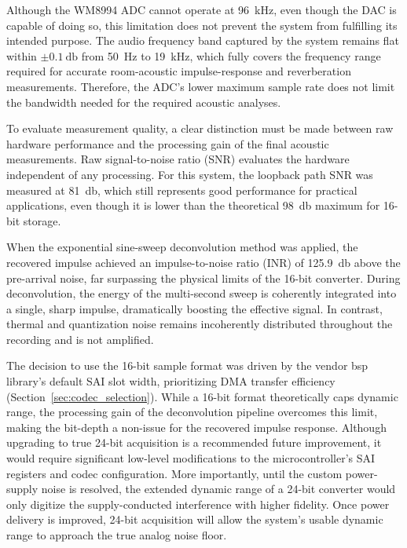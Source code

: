 Although the WM8994 ADC cannot operate at \SI{96}{\kilo\hertz}, even though the DAC is capable of doing so, this limitation does not prevent the system from fulfilling its intended purpose. The audio frequency band captured by the system remains flat within $\pm\SI{0.1}{\decibel}$ from \SI{50}{\hertz} to \SI{19}{\kilo\hertz}, which fully covers the frequency range required for accurate room-acoustic impulse-response and reverberation measurements. Therefore, the ADC’s lower maximum sample rate does not limit the bandwidth needed for the required acoustic analyses.

To evaluate measurement quality, a clear distinction must be made between raw hardware performance and the processing gain of the final acoustic measurements. Raw signal-to-noise ratio (SNR) evaluates the hardware independent of any processing. For this system, the loopback path SNR was measured at \SI{81}{\decibel}, which still represents good performance for practical applications, even though it is lower than the theoretical \SI{98}{\decibel} maximum for \mbox{16-bit} storage.

When the exponential sine-sweep deconvolution method was applied, the recovered impulse achieved an impulse-to-noise ratio (INR) of \SI{125.9}{\decibel} above the pre-arrival noise, far surpassing the physical limits of the \mbox{16-bit} converter. During deconvolution, the energy of the multi-second sweep is coherently integrated into a single, sharp impulse, dramatically boosting the effective signal. In contrast, thermal and quantization noise remains incoherently distributed throughout the recording and is not amplified. 

The decision to use the \mbox{16-bit} sample format was driven by the vendor \acrshort{bsp} library’s default SAI slot width, prioritizing DMA transfer efficiency (Section~\ref{sec:codec_selection}). While a \mbox{16-bit} format theoretically caps dynamic range, the processing gain of the deconvolution pipeline overcomes this limit, making the bit-depth a non-issue for the recovered impulse response. Although upgrading to true \mbox{24-bit} acquisition is a recommended future improvement, it would require significant low-level modifications to the microcontroller's SAI registers and codec configuration. More importantly, until the custom power-supply noise is resolved, the extended dynamic range of a \mbox{24-bit} converter would only digitize the supply-conducted interference with higher fidelity. Once power delivery is improved, \mbox{24-bit} acquisition will allow the system's usable dynamic range to approach the true analog noise floor.

